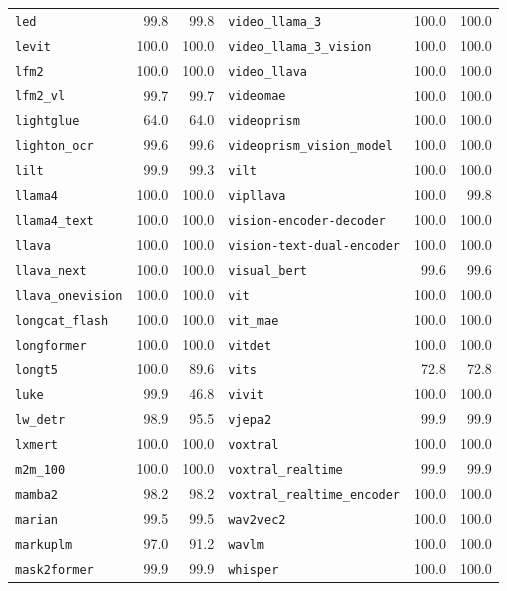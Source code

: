 \begin{longtable}{@{}lrr@{\hspace{24pt}}lrr@{}}
\texttt{led} & 99.8 & 99.8 & \texttt{video\_llama\_3} & 100.0 & 100.0 \\
\texttt{levit} & 100.0 & 100.0 & \texttt{video\_llama\_3\_vision} & 100.0 & 100.0 \\
\texttt{lfm2} & 100.0 & 100.0 & \texttt{video\_llava} & 100.0 & 100.0 \\
\texttt{lfm2\_vl} & 99.7 & 99.7 & \texttt{videomae} & 100.0 & 100.0 \\
\texttt{lightglue} & 64.0 & 64.0 & \texttt{videoprism} & 100.0 & 100.0 \\
\texttt{lighton\_ocr} & 99.6 & 99.6 & \texttt{videoprism\_vision\_model} & 100.0 & 100.0 \\
\texttt{lilt} & 99.9 & 99.3 & \texttt{vilt} & 100.0 & 100.0 \\
\texttt{llama4} & 100.0 & 100.0 & \texttt{vipllava} & 100.0 & 99.8 \\
\texttt{llama4\_text} & 100.0 & 100.0 & \texttt{vision-encoder-decoder} & 100.0 & 100.0 \\
\texttt{llava} & 100.0 & 100.0 & \texttt{vision-text-dual-encoder} & 100.0 & 100.0 \\
\texttt{llava\_next} & 100.0 & 100.0 & \texttt{visual\_bert} & 99.6 & 99.6 \\
\texttt{llava\_onevision} & 100.0 & 100.0 & \texttt{vit} & 100.0 & 100.0 \\
\texttt{longcat\_flash} & 100.0 & 100.0 & \texttt{vit\_mae} & 100.0 & 100.0 \\
\texttt{longformer} & 100.0 & 100.0 & \texttt{vitdet} & 100.0 & 100.0 \\
\texttt{longt5} & 100.0 & 89.6 & \texttt{vits} & 72.8 & 72.8 \\
\texttt{luke} & 99.9 & 46.8 & \texttt{vivit} & 100.0 & 100.0 \\
\texttt{lw\_detr} & 98.9 & 95.5 & \texttt{vjepa2} & 99.9 & 99.9 \\
\texttt{lxmert} & 100.0 & 100.0 & \texttt{voxtral} & 100.0 & 100.0 \\
\texttt{m2m\_100} & 100.0 & 100.0 & \texttt{voxtral\_realtime} & 99.9 & 99.9 \\
\texttt{mamba2} & 98.2 & 98.2 & \texttt{voxtral\_realtime\_encoder} & 100.0 & 100.0 \\
\texttt{marian} & 99.5 & 99.5 & \texttt{wav2vec2} & 100.0 & 100.0 \\
\texttt{markuplm} & 97.0 & 91.2 & \texttt{wavlm} & 100.0 & 100.0 \\
\texttt{mask2former} & 99.9 & 99.9 & \texttt{whisper} & 100.0 & 100.0 \\

\end{longtable}
